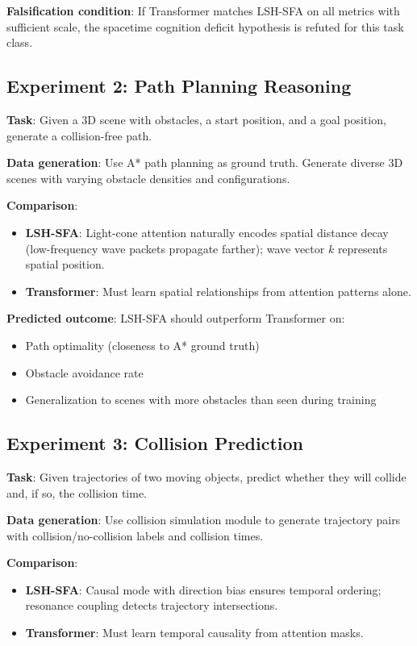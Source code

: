 \documentclass{article}
\begin{document}
\textbf{Falsification condition}: If Transformer matches LSH-SFA on all metrics with sufficient scale, the spacetime cognition deficit hypothesis is refuted for this task class.

\subsection{Experiment 2: Path Planning Reasoning}

\textbf{Task}: Given a 3D scene with obstacles, a start position, and a goal position, generate a collision-free path.

\textbf{Data generation}: Use A* path planning as ground truth. Generate diverse 3D scenes with varying obstacle densities and configurations.

\textbf{Comparison}:
\begin{itemize}
\item \textbf{LSH-SFA}: Light-cone attention naturally encodes spatial distance decay (low-frequency wave packets propagate farther); wave vector $k$ represents spatial position.
\item \textbf{Transformer}: Must learn spatial relationships from attention patterns alone.
\end{itemize}

\textbf{Predicted outcome}: LSH-SFA should outperform Transformer on:
\begin{itemize}
\item Path optimality (closeness to A* ground truth)
\item Obstacle avoidance rate
\item Generalization to scenes with more obstacles than seen during training
\end{itemize}

\subsection{Experiment 3: Collision Prediction}

\textbf{Task}: Given trajectories of two moving objects, predict whether they will collide and, if so, the collision time.

\textbf{Data generation}: Use collision simulation module to generate trajectory pairs with collision/no-collision labels and collision times.

\textbf{Comparison}:
\begin{itemize}
\item \textbf{LSH-SFA}: Causal mode with direction bias ensures temporal ordering; resonance coupling detects trajectory intersections.
\item \textbf{Transformer}: Must learn temporal causality from attention masks.
\end{itemize}
\end{document}
